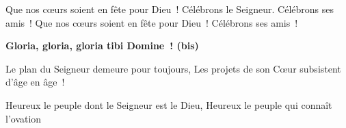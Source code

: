 Que nos cœurs soient en fête pour Dieu ! Célébrons le Seigneur. Célébrons ses amis !
Que nos cœurs soient en fête pour Dieu ! Célébrons ses amis !

\textbf{
Gloria, gloria, gloria tibi Domine ! (bis)
}

Le plan du Seigneur demeure pour toujours, Les projets de son Cœur subsistent d’âge en âge !

Heureux le peuple dont le Seigneur est le Dieu, Heureux le peuple qui connaît l’ovation 
